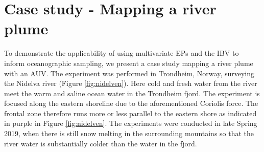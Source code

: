 \documentclass[aoas]{imsart}
\begin{document}
\begin{table}[!h]
    \centering
      \caption{Simulation results for the final mean explained variance $\bR^{2}=100*(1-(\bSigma_{posterior}/\bSigma_{initial}))$).}
    \label{tab:sim_res_r2}
\end{table}

\newpage

\section{Case study - Mapping a river plume}
\label{sec:case_study}

To demonstrate the applicability of using multivariate EPs and the IBV to inform oceanographic sampling, we present a case study mapping a river plume with an AUV. The experiment was performed in Trondheim, Norway,
surveying the Nidelva river (Figure \ref{fig:nidelven}). Here cold and fresh water from the river meet the warm and saline ocean water in the Trondheim fjord. The experiment is focused along the eastern shoreline due to the aforementioned Coriolis force. The frontal zone therefore runs more or less parallel to the eastern shore as
indicated in purple in Figure \ref{fig:nidelven}. The experiments were conducted in late Spring 2019, when there is still snow melting in the surrounding mountains so that the river water is substantially colder than the water in the fjord.
\end{document}
